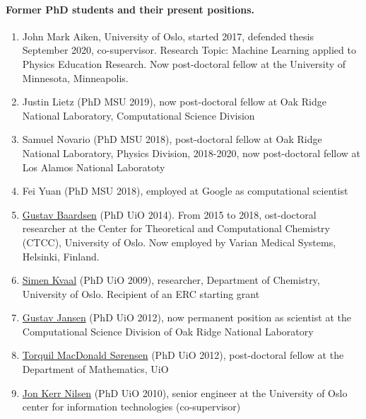 \documentclass[%
oneside,                 %
final,                   %
10pt]{article}
\begin{document}
\paragraph{Former PhD students and their present positions.}
\begin{enumerate}
\item John Mark Aiken, University of Oslo, started 2017, defended thesis September 2020, co-supervisor. Research Topic: Machine Learning applied to Physics Education Research. Now post-doctoral fellow at the University of Minnesota, Minneapolis.

\item Justin Lietz (PhD MSU 2019), now post-doctoral fellow at Oak Ridge National Laboratory, Computational Science Division

\item Samuel Novario (PhD MSU 2018), post-doctoral fellow at Oak Ridge National Laboratory, Physics Division, 2018-2020, now post-doctoral fellow at Los Alamos National Laboratoty

\item Fei Yuan (PhD MSU 2018), employed at Google as computational scientist

\item \href{{http://www.ctcc.no/people/postdocs/gba/}}{Gustav Baardsen} (PhD UiO 2014). From 2015 to 2018, ost-doctoral researcher at the Center for Theoretical and Computational Chemistry (CTCC), University of Oslo. Now employed by Varian Medical Systems, Helsinki, Finland.

\item \href{{http://www.mn.uio.no/kjemi/english/people/aca/simenkv/index.html}}{Simen Kvaal} (PhD UiO 2009), researcher, Department of Chemistry, University of Oslo. Recipient of an ERC starting grant

\item \href{{https://www.ornl.gov/staff-profile/gustav-r-jansen}}{Gustav Jansen} (PhD UiO 2012), now permanent position as scientist at the Computational Science Division of Oak Ridge National Laboratory  

\item \href{{http://www.mn.uio.no/math/english/people/aca/tmac/}}{Torquil MacDonald Sørensen} (PhD UiO 2012), post-doctoral fellow at the Department of Mathematics, UiO

\item \href{{http://www.usit.uio.no/english/about/organisation/bps/rc/ris/staff/jonkni/}}{Jon Kerr Nilsen} (PhD UiO 2010), senior engineer at the University of Oslo center for information technologies (co-supervisor)


\end{enumerate}
\end{document}
